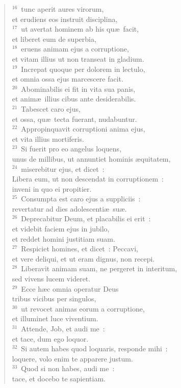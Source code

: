 \begin{flushleft}
\begin{verse}
${}^{16}$~tunc aperit aures virorum,\\ et erudiens eos instruit disciplina,\\
${}^{17}$~ut avertat hominem ab his qu\ae\ facit,\\ et liberet eum de superbia,\\
${}^{18}$~eruens animam ejus a corruptione,\\ et vitam illius ut non transeat in gladium.\\
${}^{19}$~Increpat quoque per dolorem in lectulo,\\ et omnia ossa ejus marcescere facit.\\
${}^{20}$~Abominabilis ei fit in vita sua panis,\\ et anim\ae\ illius cibus ante desiderabilis.\\
${}^{21}$~Tabescet caro ejus,\\ et ossa, qu\ae\ tecta fuerant, nudabuntur.\\
${}^{22}$~Appropinquavit corruptioni anima ejus,\\ et vita illius mortiferis.\\
${}^{23}$~Si fuerit pro eo angelus loquens,\\ unus de millibus, ut annuntiet hominis \ae quitatem,\\
${}^{24}$~miserebitur ejus, et dicet~:\\ Libera eum, ut non descendat in corruptionem~:\\ inveni in quo ei propitier.\\
${}^{25}$~Consumpta est caro ejus a suppliciis~:\\ revertatur ad dies adolescenti\ae\ su\ae .\\
${}^{26}$~Deprecabitur Deum, et placabilis ei erit~:\\ et videbit faciem ejus in jubilo,\\ et reddet homini justitiam suam.\\
${}^{27}$~Respiciet homines, et dicet~: Peccavi,\\ et vere deliqui, et ut eram dignus, non recepi.\\
${}^{28}$~Liberavit animam suam, ne pergeret in interitum,\\ sed vivens lucem videret.\\
${}^{29}$~Ecce h\ae c omnia operatur Deus\\ tribus vicibus per singulos,\\
${}^{30}$~ut revocet animas eorum a corruptione,\\ et illuminet luce viventium.\\
${}^{31}$~Attende, Job, et audi me~:\\ et tace, dum ego loquor.\\
${}^{32}$~Si autem habes quod loquaris, responde mihi~:\\ loquere, volo enim te apparere justum.\\
${}^{33}$~Quod si non habes, audi me~:\\ tace, et docebo te sapientiam.\end{verse}\end{flushleft}



